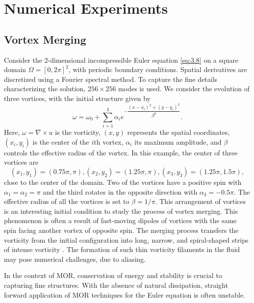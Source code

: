 \section{Numerical Experiments} \label{sec:res}

\subsection{Vortex Merging} \label{sec:res.1}
Consider the 2-dimensional incompressible Euler equation \eqref{eq:3.8} on a square domain $\Omega = [0,2\pi]^2$, with periodic boundary conditions. Spatial derivatives are discretized using a Fourier spectral method. To capture the fine details characterizing the solution, $256\times 256$ modes is used. We consider the evolution of three vortices, with the initial structure given by
\begin{equation}\label{eqn:initial_cond_vort}
\omega = \omega_0 + \sum_{i=1}^{3} \alpha_i e^{-\dfrac{\left(x-x_i\right)^{2}+\left(y-y_i\right)^{2}}{\beta^2}}.
\end{equation}
Here, $\omega = \nabla \times u$ is the vorticity, $(x,y)$ represents the spatial coordinates, $\left( x_i, y_i\right)$ is the center of the $i$th vortex, $\alpha_i$ its maximum amplitude, and $\beta$ controls the effective radius of the vortex. In this example, the center of three vortices are 
\begin{equation}
\left( x_1, y_1 \right) = \left(0.75\pi,\pi\right) , \left( x_2, y_2 \right) = \left(1.25\pi,\pi\right), \left( x_3, y_3 \right) = \left(1.25\pi,1.5\pi\right),
\end{equation}
close to the center of the domain. Two of the vortices have a positive spin with $\alpha_1 = \alpha_2 = \pi$ and the third rotates in the opposite direction with $\alpha_3 = -0.5\pi$. The effective radius of all the vortices is set to $\beta = 1 / \pi$. This arrangement of vortices is an interesting initial condition to study the process of vortex merging. This phenomenon is often a result of fast-moving dipoles of vortices with the same spin facing another vortex \cite{filaments_vort2} of opposite spin. The merging process transfers the vorticity from the initial configuration into long, narrow, and spiral-shaped strips of intense vorticity \cite{filaments_vort}. The formation of such thin vorticity filaments in the fluid may pose numerical challenges, due to aliasing. 

In the context of MOR, conservation of energy and stability is crucial to capturing fine structures. With the absence of natural dissipation, straight forward application of MOR techniques for the Euler equation is often unstable.


